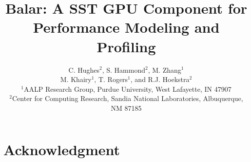 \documentclass[pdf,ps2pdf,12pt,report,strict,blank,justified]{SANDreport}
\title{Balar: A SST GPU Component for \\Performance Modeling and Profiling}
\author{C. Hughes$^2$, S. Hammond$^2$, M. Zhang$^1$ \\
            M. Khairy$^1$, T. Rogers$^1$, and R.J. Hoekstra$^2$ \\
            \small{$^1$AALP Research Group, Purdue University, West Lafayette, IN 47907} \\
            \small{$^2$Center for Computing Research, Sandia National Laboratories, Albuquerque, NM 87185} \\
           }
\date{}
\begin{document}
    \maketitle

    \begin{abstract}
       
    \end{abstract}

    \clearpage
    \section*{Acknowledgment}
      


    \cleardoublepage          %
    \tableofcontents
    \listoffigures
    \listoftables

%       


%       
\end{document}
